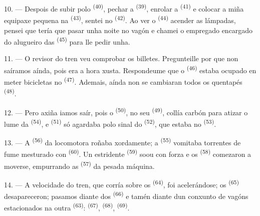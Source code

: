 \VUsaut{3.0mm}

10. --- Despois de subir polo  \textsuperscript{(40)}, pechar a
 \textsuperscript{(39)}, enrolar a 
\textsuperscript{(41)} e colocar a miña equipaxe pequena na 
\textsuperscript{(43)}, sentei no  \textsuperscript{(42)}. Ao ver o
 \textsuperscript{(44)} acender as lámpadas, pensei que tería que
pasar unha noite no vagón e chamei o empregado encargado do alugueiro das
 \textsuperscript{(45)} para lle pedir unha.

11. --- O revisor do tren veu comprobar os billetes. Pregunteille por que non
saíramos aínda, pois era a hora xusta. Respondeume que o 
\textsuperscript{(46)} estaba ocupado en meter bicicletas no 
\textsuperscript{(47)}. Ademais, aínda non se cambiaran todos os quentapés
\textsuperscript{(48)}.

12. --- Pero axiña iamos saír, pois o  \textsuperscript{(50)}, no seu
 \textsuperscript{(49)}, collía carbón para atizar o lume da
 \textsuperscript{(54)}, e 
\textsuperscript{(51)} só agardaba polo sinal do 
\textsuperscript{(52)}, que estaba no  \textsuperscript{(53)}.

13. --- A  \textsuperscript{(56)} da locomotora roñaba xordamente; a
 \textsuperscript{(55)} vomitaba torrentes de fume mesturado con
 \textsuperscript{(60)}. Un  estridente
\textsuperscript{(59)} soou con forza e os  \textsuperscript{(58)}
comezaron a moverse, empurrando as  \textsuperscript{(57)} da pesada
máquina.

\VUsaut{3.0mm}
\VUsaut{3.0mm}

14. --- A velocidade do tren, que corría sobre os 
\textsuperscript{(64)}, foi acelerándose; os  \textsuperscript{(65)}
desapareceron; pasamos diante dos  \textsuperscript{(66)} e tamén
diante dun conxunto de vagóns estacionados na outra 
\textsuperscript{(63)}:  \textsuperscript{(67)},  \textsuperscript{(68)},  \textsuperscript{(69)}.

